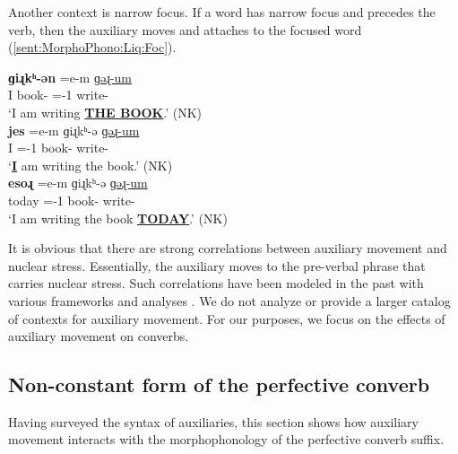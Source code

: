 Another context is narrow focus. If a word has narrow focus and precedes the verb, then the auxiliary moves and attaches to the focused word (\ref{sent:MorphoPhono:Liq:Foc}). 

\begin{exe}
	\ex \label{sent:MorphoPhono:Liq:Foc}
	\begin{xlist}
	\ex {}     \textbf{ɡiɻkʰ-ən} \colorbox{lsLightGray}{=e-m}    \uline{ɡəɻ-um}
	\\
	I   book-{}  ={\auxgloss}-1{\sg}   write-{\impfcvb} 
	\\
	\trans `I  am   writing   \uline{\textbf{THE BOOK}}.' \hfill (NK) %
	\\
		\ex \gll \textbf{jes}  \colorbox{lsLightGray}{=e-m}   ɡiɻkʰ-ə    \uline{ɡəɻ-um}
		\\
		I  ={\auxgloss}-1{\sg}   book-{}   write-{\impfcvb} 
		\\
		\trans `\uline{\textbf{I}} am   writing   the book.' \hfill (NK)
		\\
		\ex \gll \textbf{esoɻ}  \colorbox{lsLightGray}{=e-m}   ɡiɻkʰ-ə    \uline{ɡəɻ-um}
		\\
		today  ={\auxgloss}-1{\sg}   book-{}   write-{\impfcvb} 
		\\
		\trans `I am   writing   the book \uline{\textbf{TODAY}}.' \hfill (NK)
		\\
	\end{xlist}	
	
\end{exe}


It is obvious that there are strong correlations between auxiliary movement and nuclear stress. %
Essentially, the auxiliary moves to the pre-verbal phrase that carries nuclear stress. Such correlations have been modeled in the past with various frameworks and analyses  \citep{Tamrazian-1994-ArmenianSyntax,Megerdoomian-2009-ThesisBook,Kahnemuyipour-2009-SyntaxSententialStress,KahnemuyipourMegerdoomian-2011-secondcliticvP,KahnemuyipourMegerdoomian-2017-positionalDistriutionFocus,GiorgiHaroutyunian-2016-wordOrderInformationStructureModernEasternArmenian,Hodgson-2019-InformationStructureWordOrderArmenian}. We do not analyze or provide a larger catalog of contexts for auxiliary movement.  For our purposes, we   focus on the effects of auxiliary movement on converbs. 

\subsection{Non-constant form of the perfective converb}\label{section:morphophono:auxiliary:basicdata}
\begin{sloppypar}
Having surveyed the syntax of auxiliaries, this section shows how auxiliary movement interacts with the morphophonology of the perfective converb suffix.
\end{sloppypar} 


